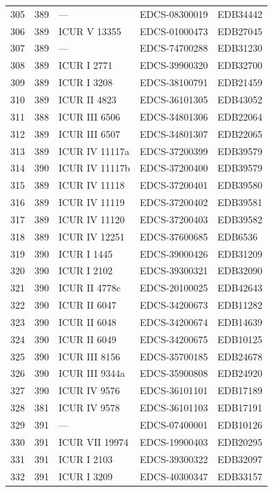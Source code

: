 \begin{longtable}{@{}r r l l l@{}}
305 & 389 & — & EDCS-08300019 & EDB34442 \\
306 & 389 & ICUR V 13355 & EDCS-01000473 & EDB27045 \\
307 & 389 & — & EDCS-74700288 & EDB31230 \\
308 & 389 & ICUR I 2771 & EDCS-39900320 & EDB32700 \\
309 & 389 & ICUR I 3208 & EDCS-38100791 & EDB21459 \\
310 & 389 & ICUR II 4823 & EDCS-36101305 & EDB43052 \\
311 & 388 & ICUR III 6506 & EDCS-34801306 & EDB22064 \\
312 & 389 & ICUR III 6507 & EDCS-34801307 & EDB22065 \\
313 & 389 & ICUR IV 11117a & EDCS-37200399 & EDB39579 \\
314 & 390 & ICUR IV 11117b & EDCS-37200400 & EDB39579 \\
315 & 389 & ICUR IV 11118 & EDCS-37200401 & EDB39580 \\
316 & 389 & ICUR IV 11119 & EDCS-37200402 & EDB39581 \\
317 & 389 & ICUR IV 11120 & EDCS-37200403 & EDB39582 \\
318 & 389 & ICUR IV 12251 & EDCS-37600685 & EDB6536 \\
319 & 390 & ICUR I 1445 & EDCS-39000426 & EDB31209 \\
320 & 390 & ICUR I 2102 & EDCS-39300321 & EDB32090 \\
321 & 390 & ICUR II 4778c & EDCS-20100025 & EDB42643 \\
322 & 390 & ICUR II 6047 & EDCS-34200673 & EDB11282 \\
323 & 390 & ICUR II 6048 & EDCS-34200674 & EDB14639 \\
324 & 390 & ICUR II 6049 & EDCS-34200675 & EDB10125 \\
325 & 390 & ICUR III 8156 & EDCS-35700185 & EDB24678 \\
326 & 390 & ICUR III 9344a & EDCS-35900808 & EDB24920 \\
327 & 390 & ICUR IV 9576 & EDCS-36101101 & EDB17189 \\
328 & 381 & ICUR IV 9578 & EDCS-36101103 & EDB17191 \\
329 & 391 & — & EDCS-07400001 & EDB10126 \\
330 & 391 & ICUR VII 19974 & EDCS-19900403 & EDB20295 \\
331 & 391 & ICUR I 2103 & EDCS-39300322 & EDB32097 \\
332 & 391 & ICUR I 3209 & EDCS-40300347 & EDB33157 \\

\end{longtable}
